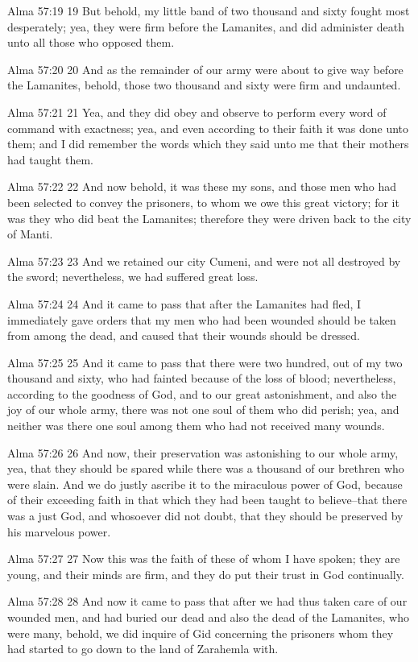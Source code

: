 Alma 57:19
 19 But behold, my little band of two thousand and sixty fought
most desperately; yea, they were firm before the Lamanites, and
did administer death unto all those who opposed them.

Alma 57:20
 20 And as the remainder of our army were about to give way
before the Lamanites, behold, those two thousand and sixty were
firm and undaunted.

Alma 57:21
 21 Yea, and they did obey and observe to perform every word of
command with exactness; yea, and even according to their faith it
was done unto them; and I did remember the words which they said
unto me that their mothers had taught them.

Alma 57:22
 22 And now behold, it was these my sons, and those men who had
been selected to convey the prisoners, to whom we owe this great
victory; for it was they who did beat the Lamanites; therefore
they were driven back to the city of Manti.

Alma 57:23
 23 And we retained our city Cumeni, and were not all destroyed
by the sword; nevertheless, we had suffered great loss.

Alma 57:24
 24 And it came to pass that after the Lamanites had fled, I
immediately gave orders that my men who had been wounded should
be taken from among the dead, and caused that their wounds should
be dressed.

Alma 57:25
 25 And it came to pass that there were two hundred, out of my
two thousand and sixty, who had fainted because of the loss of
blood; nevertheless, according to the goodness of God, and to our
great astonishment, and also the joy of our whole army, there was
not one soul of them who did perish; yea, and neither was there
one soul among them who had not received many wounds.

Alma 57:26
 26 And now, their preservation was astonishing to our whole
army, yea, that they should be spared while there was a thousand
of our brethren who were slain. And we do justly ascribe it to
the miraculous power of God, because of their exceeding faith in
that which they had been taught to believe--that there was a just
God, and whosoever did not doubt, that they should be preserved
by his marvelous power.

Alma 57:27
 27 Now this was the faith of these of whom I have spoken; they
are young, and their minds are firm, and they do put their trust
in God continually.

Alma 57:28
 28 And now it came to pass that after we had thus taken care of
our wounded men, and had buried our dead and also the dead of the
Lamanites, who were many, behold, we did inquire of Gid
concerning the prisoners whom they had started to go down to the
land of Zarahemla with.

